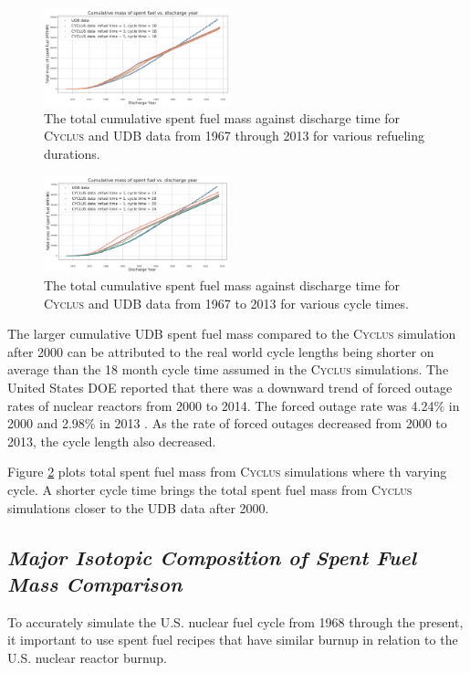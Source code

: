 \documentclass{anstrans}
\newcommand{\Cyclus}{\textsc{Cyclus}\xspace}%
\begin{document}
\begin{figure}[t] 
	\centering
	\includegraphics[width=0.48\textwidth]{figures/total_cumulative_mass_spent_fuel_refueltime}
	\caption{The total cumulative spent fuel mass against discharge time for \Cyclus and UDB data from 1967 through 2013 for various refueling durations.}
	\label{fig:total_refueltime}
\end{figure} 

\begin{figure}[b] %
	\centering
	\includegraphics[width=0.48\textwidth]{figures/total_cumulative_mass_spent_fuel_cycletime}
	\caption{The total cumulative spent fuel mass against discharge time for \Cyclus and UDB data from 1967 to 2013 for various cycle times.}
	\label{fig:total_cycletime}
\end{figure} 

The larger cumulative UDB spent fuel mass compared to the \Cyclus simulation 
after 2000 can be attributed to the real world cycle lengths being shorter on 
average than the 18 month cycle time assumed in the  \Cyclus simulations. The 
United States DOE reported that there was a downward trend of forced outage 
rates of nuclear reactors from 2000 to 2014. The forced outage rate was 4.24\% 
in 2000 and 2.98\% in 2013 \cite{gehin_nuclear_2016}. As the rate of forced 
outages decreased from 2000 to 2013, the cycle length also decreased. 

Figure \ref{fig:total_cycletime} plots total spent fuel mass from 
\Cyclus simulations where th varying cycle. A shorter cycle time brings the 
total spent fuel mass from \Cyclus simulations closer to the UDB data after 
2000. 

\subsection{\textit{Major Isotopic Composition of  Spent Fuel Mass Comparison}}
To accurately simulate the U.S. nuclear fuel cycle from 1968 through the present, 
it important to use spent fuel recipes that have similar burnup in relation to 
the U.S. nuclear reactor burnup. 
\end{document}
